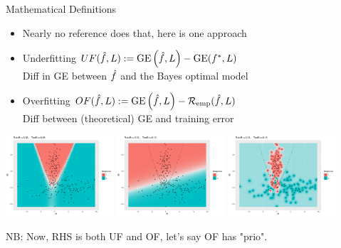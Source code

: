 \documentclass[11pt,compress,t,notes=noshow, xcolor=table]{beamer}
\begin{document}
\begin{vbframe}{Mathematical Definitions}

\begin{itemize}
\item Nearly no reference does that, here is one approach
\item Underfitting
    $UF(\hat{f}, L) : = \mathrm{GE}\left(\hat{f}, L\right) - \mathrm{GE}(f^{\ast}, L)$\\
    Diff in GE between $\hat{f}$ and the Bayes optimal model
\item Overfitting
    $OF(\hat{f}, L) : = \mathrm{GE}\left(\hat{f}, L\right) - \mathcal{R}_{\text{emp}}(\hat{f}, L)$\\
    Diff between (theoretical) GE and training error
\end{itemize}

\lz

\begin{center}
\includegraphics[width=0.3\textwidth,trim={0.8cm 0.6cm 3cm 0},clip]{figure/eval_ofit_1a}
\includegraphics[width=0.3\textwidth,trim={0.8cm 0.6cm 3cm 0},clip]{figure/eval_ofit_1u}
\includegraphics[width=0.3\textwidth,trim={0.8cm 0.6cm 3cm 0},clip]{figure/eval_ofit_1o}
\end{center}
NB: Now, RHS is both UF and OF, let's say OF has "prio". 
\end{vbframe}
\end{document}
